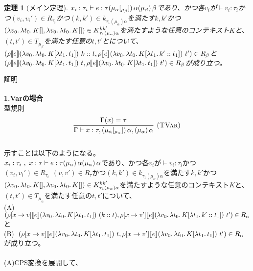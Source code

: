 \documentclass[japanese,draft]{jssst_ppl} %
\newtheorem{theorem}[definition]{定理}
\begin{document}
\setcounter{definition}{7}
\begin{theorem}[メイン定理]
  $x_i:\tau_i \vdash e:\tau (\mu_{\alpha}\lbrack \tiny{_{\mu_{\beta}}} \rbrack)\,\alpha (\mu_{\beta})\,\beta$であり、かつ各$v_i$が$\vdash v_i:\tau_i$かつ$(v_i,v_i') \in R_{\tau_i}$かつ$(k,k')\in k_{\tau_1(\mu_{\alpha})\alpha}$を満たす$k,k'$かつ$(\lambda{v_0}.\,{\lambda{t_0}.\,{K[]}}, \lambda{v_0}.\,{\lambda{t_0}.\,{K[]}})\in  K^{kk'}_{\tau_1(\mu_{\alpha})\alpha}$を満たすような任意のコンテキスト$K$と、$(t, t') \in T_{\mu_{\beta}}$を満たす任意の$t, t'$とについて、\\
  $(\rho [\![{e}]\!] (\lambda{v_0}.\,{\lambda{t_0}.\,{K[\lambda{t_1}.\,{t_1}]}})\ k::t, \rho [\![{e}]\!] (\lambda{v_0}.\,{\lambda{t_0}.\,{K[\lambda{t_1}.\,{k'::t_1}]}})\ t')\in R_{\beta}$と\\
  $(\rho [\![{e}]\!] (\lambda{v_0}.\,{\lambda{t_0}.\,{K[\lambda{t_1}.\,{t_1}]}})\ t, \rho [\![{e}]\!] (\lambda{v_0}.\,{\lambda{t_0}.\,{K[\lambda{t_1}.\,{t_1}]}})\ t')\in R_{\beta}$が成り立つ。
\end{theorem}
\lbrack 証明 \rbrack\\\\
\textbf{1.Varの場合}\\
型規則
\[
\begin{array}{c}
\infer[\TVar]
      {\JudgeTrail{\Gamma}{x}{\tau}{\TrailsType{\alpha}{\alpha}}
                                   {\TrailType{\alpha}}}
      {\Gamma(x)=\tau}
\end{array}
\]
\\
示すことは以下のようになる。\\
$x_i:\tau_i\ ,\ x:\tau\vdash e:\tau (\mu_{\alpha})\,\alpha (\mu_{\alpha})\,\alpha$であり、かつ各$v_i$が$\vdash v_i:\tau_i$かつ$(v_i,v_i') \in R_{\tau_i}\ \ (v,v')\in R_{\tau}$かつ$(k,k')\in k_{\tau_1(\mu_{\alpha})\alpha}$を満たす$k,k'$かつ$(\lambda{v_0}.\,{\lambda{t_0}.\,{K[]}}, \lambda{v_0}.\,{\lambda{t_0}.\,{K[]}})\in  K^{kk'}_{\tau_1(\mu_{\alpha})\alpha}$を満たすような任意のコンテキスト$K$と、$(t, t') \in T_{\mu_{\alpha}}$を満たす任意の$t, t'$について、\\
  (A)\ $(\rho[x \rightarrow v] [\![{e}]\!] (\lambda{v_0}.\,{\lambda{t_0}.\,{K[\lambda{t_1}.\,{t_1}]}})\ (k::t), \rho[x \rightarrow v'] [\![{e}]\!] (\lambda{v_0}.\,{\lambda{t_0}.\,{K[\lambda{t_1}.\,{k'::t_1}]}})\ t')\in R_{\alpha}$と\\
  (B)\ $(\rho[x \rightarrow v] [\![{e}]\!] (\lambda{v_0}.\,{\lambda{t_0}.\,{K[\lambda{t_1}.\,{t_1}]}})\ t, \rho[x \rightarrow v'] [\![{e}]\!] (\lambda{v_0}.\,{\lambda{t_0}.\,{K[\lambda{t_1}.\,{t_1}]}})\ t')\in R_{\alpha}$が成り立つ。\\
\\
(A)CPS変換を展開して、\\
\end{document}
